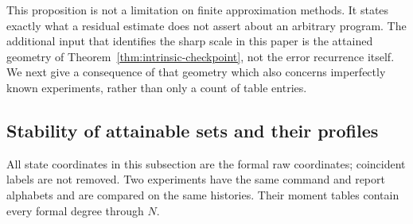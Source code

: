 This proposition is not a limitation on finite approximation methods.
It states exactly what a residual estimate does not assert about an
arbitrary program. The additional input that identifies the sharp
scale in this paper is the attained geometry of
Theorem~\ref{thm:intrinsic-checkpoint}, not the error recurrence itself.
We next give a consequence of that geometry which also concerns
imperfectly known experiments, rather than only a count of table entries.

\subsection{Stability of attainable sets and their profiles}
All state coordinates in this subsection are the formal raw coordinates;
coincident labels are not removed. Two experiments have the same
command and report alphabets and are compared on the same histories.
Their moment tables contain every formal degree through $N$.

